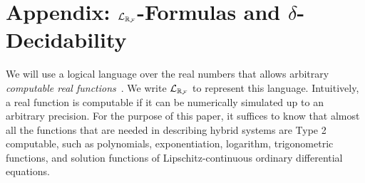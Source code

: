 \newpage
\section*{Appendix: $\mathcal{L}_{\mathbb{R}_{\mathcal{F}}}$-Formulas and $\delta$-Decidability}

We will use a logical language over the real numbers that allows arbitrary {\em computable real functions}~\cite{CAbook}. We write $\mathcal{L}_{\mathbb{R}_{\mathcal{F}}}$ to represent this language. Intuitively, a real function is computable if it can be numerically simulated up to an arbitrary precision. For the purpose of this paper, it suffices to know that almost all the functions that are needed in describing hybrid systems are Type 2 computable, such as polynomials, exponentiation, logarithm, trigonometric functions, and solution functions of Lipschitz-continuous ordinary differential equations.

